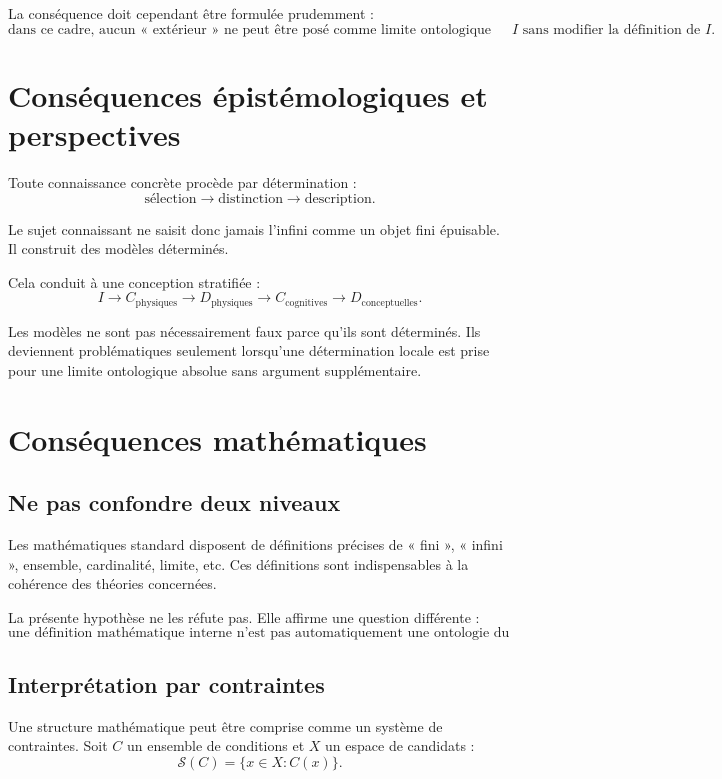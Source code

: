 \documentclass[11pt,a4paper]{article}
\begin{document}
La conséquence doit cependant être formulée prudemment :
\[
\boxed{
\text{dans ce cadre, aucun « extérieur » ne peut être posé comme limite
ontologique ultime de \(I\) sans modifier la définition de \(I\).}
}
\]

\section{Conséquences épistémologiques et perspectives}

Toute connaissance concrète procède par détermination :
\[
\text{sélection}\to\text{distinction}\to\text{description}.
\]

Le sujet connaissant ne saisit donc jamais l'infini comme un objet fini
épuisable. Il construit des modèles déterminés.

Cela conduit à une conception stratifiée :
\[
I
\to
C_{\text{physiques}}
\to
D_{\text{physiques}}
\to
C_{\text{cognitives}}
\to
D_{\text{conceptuelles}}.
\]

Les modèles ne sont pas nécessairement faux parce qu'ils sont déterminés.
Ils deviennent problématiques seulement lorsqu'une détermination locale est
prise pour une limite ontologique absolue sans argument supplémentaire.

\section{Conséquences mathématiques}

\subsection{Ne pas confondre deux niveaux}

Les mathématiques standard disposent de définitions précises de « fini »,
« infini », ensemble, cardinalité, limite, etc. Ces définitions sont
indispensables à la cohérence des théories concernées.

La présente hypothèse ne les réfute pas. Elle affirme une question différente :
\[
\boxed{
\text{une définition mathématique interne n'est pas automatiquement une
ontologie du réel.}
}
\]

\subsection{Interprétation par contraintes}

Une structure mathématique peut être comprise comme un système de
contraintes. Soit \(C\) un ensemble de conditions et \(X\) un espace de
candidats :
\[
\mathcal S(C)=\{x\in X:C(x)\}.
\]
\end{document}

